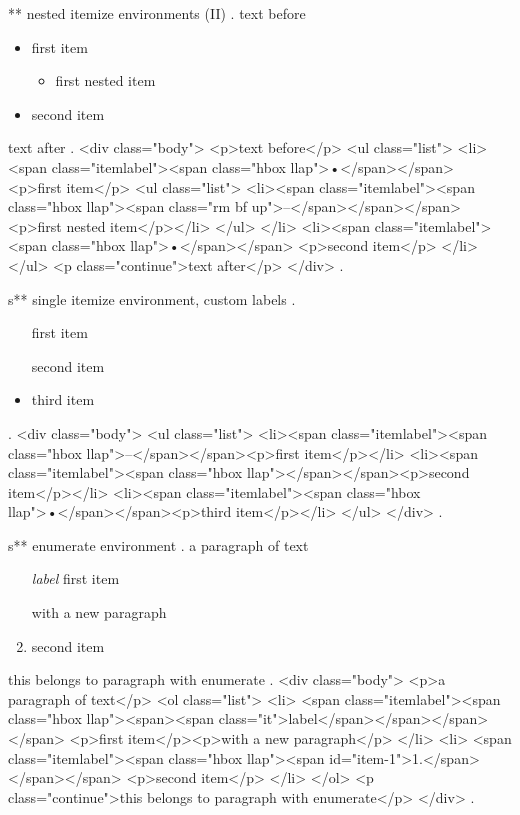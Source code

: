 ** nested itemize environments (II)
.
text before
\begin{itemize}
    \item first item
        \begin{itemize}
            \item first nested item
        \end{itemize}
    \item second item
\end{itemize}
text after
.
<div class="body">
<p>text before</p>
<ul class="list">
<li><span class="itemlabel"><span class="hbox llap">•</span></span>
<p>ﬁrst item</p>
<ul class="list">
<li><span class="itemlabel"><span class="hbox llap"><span class="rm bf up">–</span></span></span><p>ﬁrst nested item</p></li>
</ul>
</li>
<li><span class="itemlabel"><span class="hbox llap">•</span></span>
<p>second item</p>
</li>
</ul>
<p class="continue">text after</p>
</div>
.


s** single itemize environment, custom labels
.
\begin{itemize}
    \item[\textendash] first item
    \item[] second item
    \item third item
\end{itemize}
.
<div class="body">
<ul class="list">
<li><span class="itemlabel"><span class="hbox llap">–</span></span><p>ﬁrst item</p></li>
<li><span class="itemlabel"><span class="hbox llap"></span></span><p>second item</p></li>
<li><span class="itemlabel"><span class="hbox llap">•</span></span><p>third item</p></li>
</ul>
</div>
.



s** enumerate environment
.
a paragraph of text

\begin{enumerate}
    \item[\itshape label] first item

        with a new paragraph
    \item second item
\end{enumerate}
this belongs to paragraph with enumerate
.
<div class="body">
<p>a paragraph of text</p>
<ol class="list">
<li>
<span class="itemlabel"><span class="hbox llap"><span><span class="it">label</span></span></span></span>
<p>ﬁrst item</p><p>with a new paragraph</p>
</li>
<li>
<span class="itemlabel"><span class="hbox llap"><span id="item-1">1.</span></span></span>
<p>second item</p>
</li>
</ol>
<p class="continue">this belongs to paragraph with enumerate</p>
</div>
.


